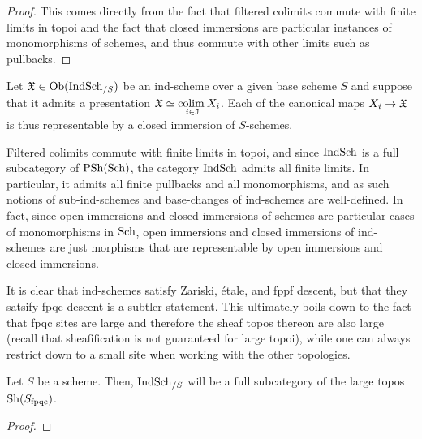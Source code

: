                 \begin{proof}
                    This comes directly from the fact that filtered colimits commute with finite limits in topoi and the fact that closed immersions are particular instances of monomorphisms of schemes, and thus commute with other limits such as pullbacks.
                \end{proof}
            \begin{corollary}
                Let $\mathfrak{X} \in \mathrm{Ob}(\mathrm{Ind}\mathrm{Sch}_{/S})$ be an ind-scheme over a given base scheme $S$ and suppose that it admits a presentation $\mathfrak{X} \simeq \underset{i \in \mathcal{I}}{\operatorname{colim} \:} X_i$. Each of the canonical maps $X_i \to \mathfrak{X}$ is thus representable by a closed immersion of $S$-schemes. 
            \end{corollary}
            \begin{remark} \label{remark: finite_limits_of_ind_schemes}
                Filtered colimits commute with finite limits in topoi, and since $\mathrm{Ind}\mathrm{Sch}$ is a full subcategory of $\mathrm{PSh}(\mathrm{Sch})$, the category $\mathrm{Ind}\mathrm{Sch}$ admits all finite limits. In particular, it admits all finite pullbacks and all monomorphisms, and as such notions of sub-ind-schemes and base-changes of ind-schemes are well-defined. In fact, since open immersions and closed immersions of schemes are particular cases of monomorphisms in $\mathrm{Sch}$, open immersions and closed immersions of ind-schemes are just morphisms that are representable by open immersions and closed immersions. 
            \end{remark}
            \begin{remark}
                It is clear that ind-schemes satisfy Zariski, \'etale, and fppf descent, but that they satsify fpqc descent is a subtler statement. This ultimately boils down to the fact that fpqc sites are large and therefore the sheaf topos thereon are also large (recall that sheafification is not guaranteed for large topoi), while one can always restrict down to a small site when working with the other topologies.
            \end{remark}
            \begin{proposition} \label{prop: ind_schemes_are_fpqc_sheaves}
                Let $S$ be a scheme. Then, $\mathrm{Ind}\mathrm{Sch}_{/S}$ will be a full subcategory of the large topos $\mathrm{Sh}(S_{\mathrm{fpqc}})$.
            \end{proposition}
                \begin{proof}
                    
                \end{proof}
            
